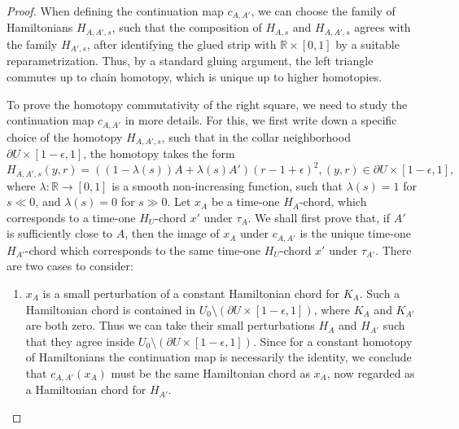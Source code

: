 \documentclass{amsart}
\numberwithin{equation}{section}
\numberwithin{figure}{section}
\begin{document}
\begin{proof}
	When defining the continuation map $c_{A, A'}$, we can choose the family of Hamiltonians $H_{A, A', s}$, such that the composition of $H_{A, s}$ and $H_{A, A', s}$ agrees with the family $H_{A', s}$, after identifying the glued strip with $\mathbb{R} \times [0, 1]$ by a suitable reparametrization. Thus, by a standard gluing argument, the left triangle commutes up to chain homotopy, which is unique up to higher homotopies. \par
	To prove the homotopy commutativity of the right square, we need to study the continuation map $c_{A, A'}$ in more details. For this, we first write down a specific choice of the homotopy $H_{A, A', s}$, such that in the collar neighborhood $\partial U \times [1-\epsilon, 1]$, the homotopy takes the form
\begin{equation}\label{specific choice of monotone homotopy of Hamiltonians}
H_{A, A', s}(y, r) = ((1-\lambda(s))A + \lambda(s)A')(r-1+\epsilon)^{2}, (y, r) \in \partial U \times [1-\epsilon, 1],
\end{equation}
where $\lambda: \mathbb{R} \to [0, 1]$ is a smooth non-increasing function, such that $\lambda(s) = 1$ for $s \ll 0$, and $\lambda(s) = 0$ for $s \gg 0$.
Let $x_{A}$ be a time-one $H_{A}$-chord, which corresponds to a time-one $H_{U}$-chord $x'$ under $\tau_{A}$. We shall first prove that, if $A'$ is sufficiently close to $A$, then the image of $x_{A}$ under $c_{A, A'}$ is the unique time-one $H_{A'}$-chord which corresponds to the same time-one $H_{U}$-chord $x'$ under $\tau_{A'}$.
There are two cases to consider:
\begin{enumerate}[label=(\roman*)]

\item $x_{A}$ is a small perturbation of a constant Hamiltonian chord for $K_{A}$. Such a Hamiltonian chord is contained in $U_{0} \setminus (\partial U \times [1-\epsilon, 1])$, where $K_{A}$ and $K_{A'}$ are both zero. Thus we can take their small perturbations $H_{A}$ and $H_{A'}$ such that they agree inside $U_{0} \setminus (\partial U \times [1-\epsilon, 1])$. Since for a constant homotopy of Hamiltonians the continuation map is necessarily the identity, we conclude that $c_{A, A'}(x_{A})$ must be the same Hamiltonian chord as $x_{A}$, now regarded as a Hamiltonian chord for $H_{A'}$.


\end{enumerate}
\end{proof}
\end{document}
